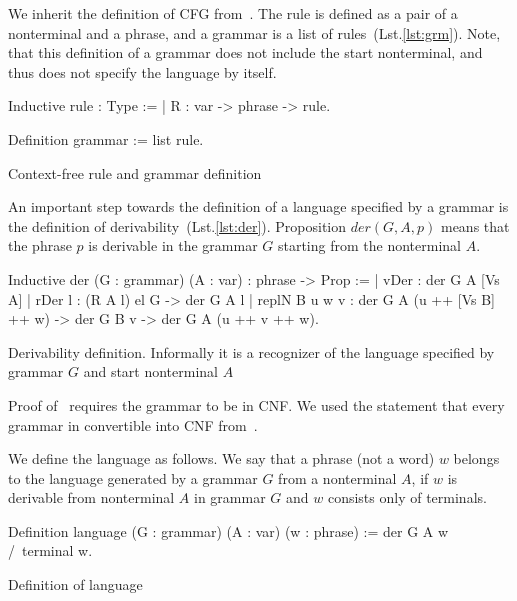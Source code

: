 We inherit the definition of CFG from~\cite{smolkaHofmann2016}. The rule is defined as a pair of a nonterminal and a phrase, and a grammar is a list of rules~(Lst.\ref{lst:grm}).
Note, that this definition of a grammar does not include the start nonterminal, and thus does not specify the language by itself.

\begin{listing}[h]
    \begin{pyglist}[language=coq, numbers=none, numbersep=5pt]
  Inductive rule : Type :=
  | R : var -> phrase -> rule.
        
  Definition grammar := list rule.
    \end{pyglist}
    \caption{Context-free rule and grammar definition}
    \label{lst:grm}
\end{listing}

An important step towards the definition of a language specified by a grammar is the definition of derivability~(Lst.\ref{lst:der}). Proposition $der(G, A, p)$ means that the phrase $p$ is derivable in the grammar $G$ starting from the nonterminal $A$.

\begin{listing}[h]
    \begin{pyglist}[language=coq, numbers=none, numbersep=5pt]
  Inductive der (G : grammar) 
                (A : var) : phrase -> Prop :=
  | vDer : der G A [Vs A]
  | rDer l : (R A l) el G -> der G A l
  | replN B u w v : 
      der G A (u ++ [Vs B] ++ w) -> 
      der G B v -> der G A (u ++ v ++ w).
    \end{pyglist}
    \caption{Derivability definition. Informally it is a recognizer of the language specified by grammar $G$ and start nonterminal $A$}
    \label{lst:der}
\end{listing}

Proof of~\cite{beigelproof} requires the grammar to be in CNF. We used the statement that every grammar in convertible into CNF from~\cite{smolkaHofmann2016}.

We define the language as follows. We say that a phrase (not a word) $ w $ belongs to the language generated by a grammar $G$ from a nonterminal $A$, if $ w $ is derivable from nonterminal $ A $ in grammar $ G $ and $ w $ consists only of terminals.

\begin{listing}[h]
	\begin{pyglist}[language=coq, numbers=none, numbersep=5pt]
  Definition language 
            (G : grammar) (A : var) (w : phrase) :=
    der G A w /\ terminal w.
	\end{pyglist}
	\caption{Definition of language}
	\label{lst:lang}
\end{listing}



